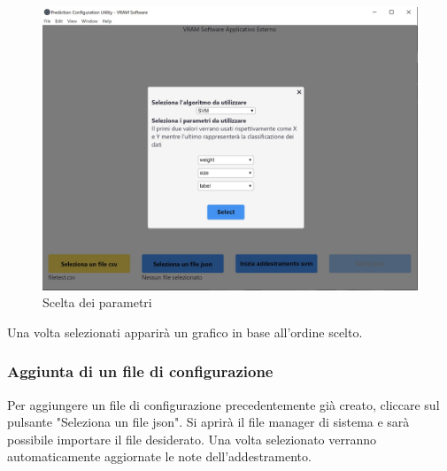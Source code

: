 		\begin{figure} [H]
			\begin{center}
				\includegraphics[width=\linewidth]{./img/2.jpg}
			\end{center}
			\caption{Scelta dei parametri}
		\end{figure}
		\mbox{}
		Una volta selezionati apparirà un grafico in base all'ordine scelto.
		\subsubsection{Aggiunta di un file di configurazione}
		Per aggiungere un file di configurazione precedentemente già creato, cliccare sul pulsante "Seleziona un file json".
		Si aprirà il file manager di sistema e sarà possibile importare il file desiderato. Una volta selezionato verranno automaticamente aggiornate le note dell'addestramento.
